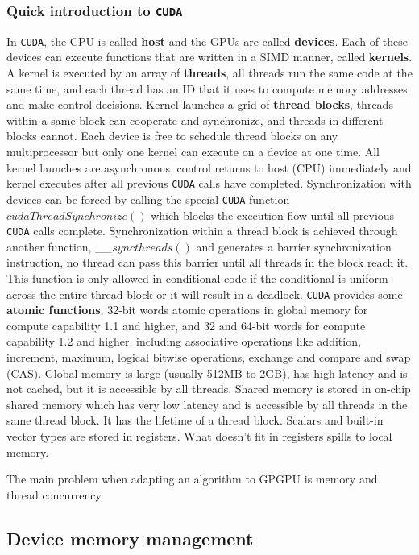 \documentclass[12pt,journal,compsoc]{IEEEtran}
\begin{document}
\subsubsection{Quick introduction to \texttt{CUDA}}
In \texttt{CUDA}, the CPU is called \textbf{host} and the GPUs are called \textbf{devices}. 
Each of these devices can execute functions that are written in a SIMD manner, called \textbf{kernels}. 
A kernel is executed by an array of \textbf{threads}, all threads run the same code at the same time, and each thread has an ID that it uses to compute memory addresses and make control decisions. 
Kernel launches a grid of \textbf{thread blocks}, threads within a same block can cooperate and synchronize, and threads in different blocks cannot. 
Each device is free to schedule thread blocks on any multiprocessor but only one kernel can execute on a device at one time.
All kernel launches are asynchronous, control returns to host (CPU) immediately and kernel executes after all previous \texttt{CUDA} calls have completed.
Synchronization with devices can be forced by calling the special \texttt{CUDA} function $cudaThreadSynchronize()$ which blocks the execution flow until all previous \texttt{CUDA} calls complete.
Synchronization within a thread block is achieved through another function, \_\_$syncthreads()$ and generates a barrier synchronization instruction, no thread can pass this barrier until all threads in the block reach it.
This function is only allowed in conditional code if the conditional is uniform across the entire thread block or it will result in a deadlock.
\texttt{CUDA} provides some \textbf{atomic functions}, 32-bit words atomic operations in global memory for compute capability 1.1 and higher, and 32 and 64-bit words for compute capability 1.2 and higher, including associative operations like addition, increment, maximum, logical bitwise operations, exchange and compare and swap (CAS).
Global memory is large (usually 512MB to 2GB), has high latency and is not cached, but it is accessible by all threads.
Shared memory is stored in on-chip shared memory which has very low latency and is accessible by all threads in the same thread block.
It has the lifetime of a thread block.
Scalars and built-in vector types are stored in registers. What doesn’t fit in registers spills to local memory.

The main problem when adapting an algorithm to GPGPU is memory and thread concurrency. 

\subsection{Device memory management}
\end{document}

